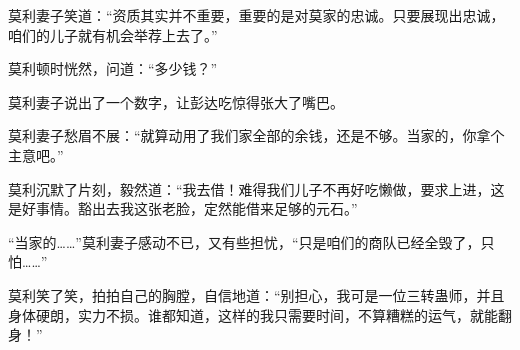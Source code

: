 \begin{this_body}
莫利妻子笑道：“资质其实并不重要，重要的是对莫家的忠诚。只要展现出忠诚，咱们的儿子就有机会举荐上去了。”

莫利顿时恍然，问道：“多少钱？”

莫利妻子说出了一个数字，让彭达吃惊得张大了嘴巴。

莫利妻子愁眉不展：“就算动用了我们家全部的余钱，还是不够。当家的，你拿个主意吧。”

莫利沉默了片刻，毅然道：“我去借！难得我们儿子不再好吃懒做，要求上进，这是好事情。豁出去我这张老脸，定然能借来足够的元石。”

“当家的……”莫利妻子感动不已，又有些担忧，“只是咱们的商队已经全毁了，只怕……”

莫利笑了笑，拍拍自己的胸膛，自信地道：“别担心，我可是一位三转蛊师，并且身体硬朗，实力不损。谁都知道，这样的我只需要时间，不算糟糕的运气，就能翻身！”

\end{this_body}

